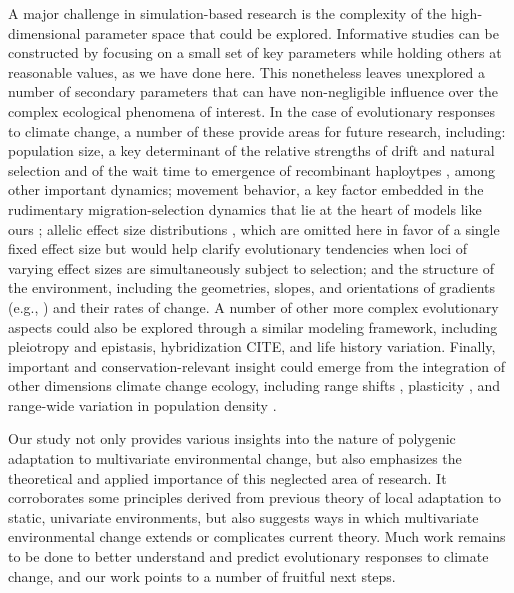 \documentclass[9pt,twocolumn,twoside,lineno]{pnas-new}
\begin{document}
A major challenge in simulation-based research is the complexity of the high-dimensional 
parameter space that could be explored.
Informative studies can be constructed by focusing on a small set of
key parameters while holding others at reasonable values, as we have done here.
This nonetheless leaves unexplored a number of secondary parameters
that can have non-negligible influence over the complex ecological phenomena of interest.
In the case of evolutionary responses to climate change,
a number of these provide areas for future research, including:
population size, a key determinant of the relative strengths of drift
and natural selection \cite{murray} and of the wait time to emergence of
recombinant haploytpes \cite{christiansen}, among other important dynamics;
movement behavior, a key factor embedded in the rudimentary
migration-selection dynamics that lie at the heart of models like ours
\cite{wright,haldane,barton};
allelic effect size distributions \cite{orr},
which are omitted here in favor of a single fixed effect size but would
help clarify evolutionary tendencies when loci of varying effect sizes
are simultaneously subject to selection;
and the structure of the environment,
including the geometries, slopes, and orientations of gradients
(e.g., \cite{benes}) and their rates of change.
A number of other more complex evolutionary aspects could also be explored 
through a similar modeling framework, including 
pleiotropy \cite{thompson} and epistasis,
hybridization CITE, and life history variation.
Finally, important and conservation-relevant insight could emerge from the 
integration of other dimensions climate change ecology, including range shifts 
\cite{weiss-lehman}, plasticity \cite{chevin},
and range-wide variation in population density \cite{aitken_whitlock}.

Our study not only provides various insights into the nature
of polygenic adaptation to multivariate environmental change,
but also emphasizes the theoretical and applied importance
of this neglected area of research.
It corroborates some principles derived from previous theory
of local adaptation to static, univariate environments, but also suggests
ways in which multivariate environmental change extends
or complicates current theory.
Much work remains to be done to better understand and predict
evolutionary responses to climate change,
and our work points to a number of fruitful next steps.
\end{document}
